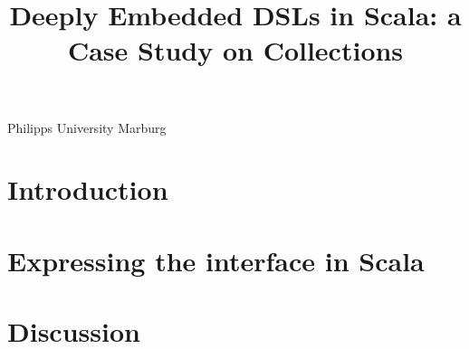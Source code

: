 \documentclass[preprint,9pt]{sigplanconf}
\begin{document}
\sloppy



\title{Deeply Embedded DSLs in {Scala}: a Case Study on Collections}



	   {Philipps University Marburg}

\maketitle



\section{Introduction}


\section{Expressing the interface in Scala}
\label{sec:intfScala}


\section{Discussion}
\label{sec:discussion}


\end{document}
